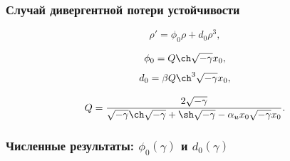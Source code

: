 \documentclass[fullscreen=true, unicode, bookmarks=false]{beamer}
\begin{document}
\begin{frame}
\frametitle{ Случай дивергентной потери устойчивости }

\begin{equation}
	\rho' = \phi_0 \rho + d_0 \rho^3,
\end{equation}

\bigskip
\pause

$$ \phi_0 = Q \ch \sqrt{-\gamma} x_0, $$
$$ d_0 = \beta Q \ch^3 \sqrt{-\gamma} x_0, $$

$$ Q = \frac{2\sqrt{-\gamma}}{\sqrt{-\gamma}\ch\sqrt{-\gamma} + \sh\sqrt{-\gamma} - \alpha_u x_0 \sqrt{-\gamma} x_0}. $$

\end{frame}

\begin{frame}
\frametitle{ Численные результаты: $ \phi_0(\gamma) $ и $ d_0(\gamma) $ }


\end{frame}
\end{document}
